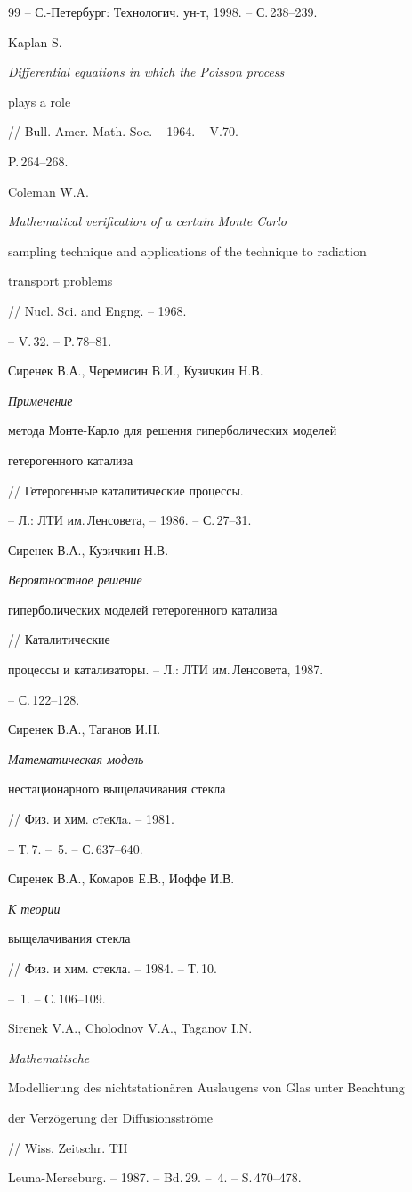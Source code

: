 \begin{thebibliography}{99}
-- С.-Петербург: Технологич. ун-т, 1998. -- С.\,238--239. 




Kaplan S. {\em Differential equations in which the Poisson process 


plays a role} // Bull. Amer. Math. Soc. -- 1964. -- V.70. -- 


P.\,264--268. 




Coleman W.A. {\em Mathematical verification of a certain Monte Carlo


sampling technique and applications of the technique to radiation 


transport problems} // Nucl. Sci. and Engng. -- 1968. 


-- V.\,32. -- P.\,78--81. 




Сиренек В.А., Черемисин В.И., Кузичкин Н.В. {\em Применение 


метода Монте-Карло для решения гиперболических моделей 


гетерогенного катализа} // Гетерогенные каталитические процессы. 


-- Л.: ЛТИ им.\,Ленсовета, -- 1986. -- С.\,27--31. 




Сиренек В.А., Кузичкин Н.В. {\em Вероятностное решение 


гиперболических моделей гетерогенного катализа} // Каталитические 


процессы и катализаторы. -- Л.: ЛТИ им.\,Ленсовета, 1987. 


-- С.\,122--128. 




Сиренек В.А., Таганов И.Н. {\em Математическая модель 


нестационарного выщелачивания стекла} // Физ. и хим. cтeклa. -- 1981. 


-- Т.\,7. -- \No\,5. -- С.\,637--640. 




Сиренек В.А., Комаров Е.В., Иоффе И.В. {\em К теории 


выщелачивания стекла} // Физ. и хим. стекла. -- 1984. -- Т.\,10. 


-- \No\,1. -- С.\,106--109. 




Sirenek V.A., Cholodnov V.A., Taganov I.N. {\em Mathematische 


Modellierung des nichtstation\"aren Auslaugens von Glas unter Beachtung 


der Verz\"ogerung der Diffusionsstr\"ome} // Wiss. Zeitschr. TH 


Leuna-Merseburg. -- 1987. -- Bd.\,29. -- \No\,4. -- S.\,470--478. 


 


\end{thebibliography} 


